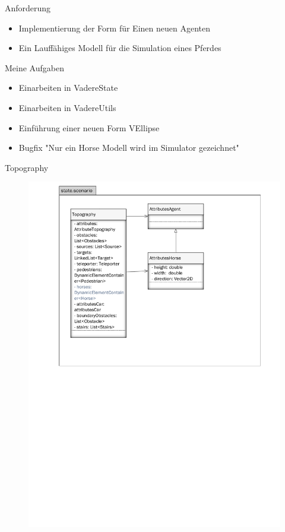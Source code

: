 \begin{frame}{Anforderung}
	\begin{itemize}
		\item Implementierung der Form für Einen neuen Agenten
		\item Ein Lauffähiges Modell für die Simulation eines Pferdes
	\end{itemize}
\end{frame}

\begin{frame}{Meine Aufgaben}
	\begin{itemize}
		\item Einarbeiten in VadereState
		\item Einarbeiten in VadereUtils
		\item Einführung einer neuen Form VEllipse
		\item Bugfix "Nur ein Horse Modell wird im Simulator gezeichnet"
	\end{itemize}
\end{frame}

\begin{frame}{Topography}
	\begin{figure}
		\includegraphics[width=\textwidth, keepaspectratio]{appendix/uml/Topography.pdf}
	\end{figure}
\end{frame}

